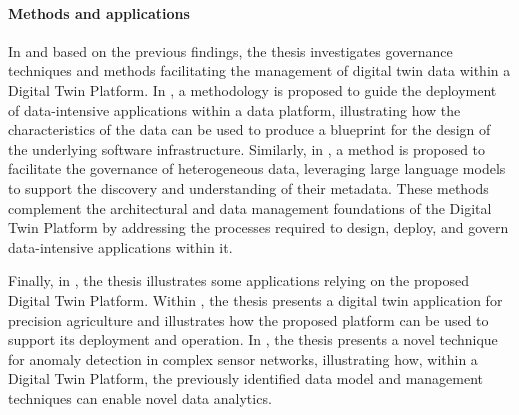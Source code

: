 \paragraph{Methods and applications}
In  and based on the previous findings, the thesis investigates governance techniques and methods facilitating the management of digital twin data within a Digital Twin Platform.
%
In , a methodology is proposed to guide the deployment of data-intensive applications within a data platform, illustrating how the characteristics of the data can be used to produce a blueprint for the design of the underlying software infrastructure.
%
Similarly, in , a method is proposed to facilitate the governance of heterogeneous data, leveraging large language models to support the discovery and understanding of their metadata.
%
These methods complement the architectural and data management foundations of the Digital Twin Platform by addressing the processes required to design, deploy, and govern data-intensive applications within it.

Finally, in , the thesis illustrates some applications relying on the proposed Digital Twin Platform.
%
Within , the thesis presents a digital twin application for precision agriculture and illustrates how the proposed platform can be used to support its deployment and operation.
%
In , the thesis presents a novel technique for anomaly detection in complex sensor networks, illustrating how, within a Digital Twin Platform, the previously identified data model and management techniques can enable novel data analytics.

